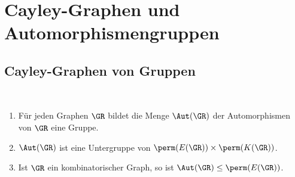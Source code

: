 \chapter{Cayley-Graphen und Automorphismengruppen}

\section{Cayley-Graphen von Gruppen}\label{sec_cayley}

\BEM\
\begin{enumerate}
\item Für jeden Graphen $\GR$ bildet die Menge $\Aut(\GR)$ der
Automorphismen von $\GR$ eine Gruppe.\index{$\Aut(\GR)$}
\item $\Aut(\GR)$ ist eine Untergruppe von
$\perm(E(\GR)) \times \perm(K(\GR))$.
\item Ist $\GR$ ein kombinatorischer Graph, so ist
$\Aut(\GR)\leq \perm(E(\GR))$.
\end{enumerate}

